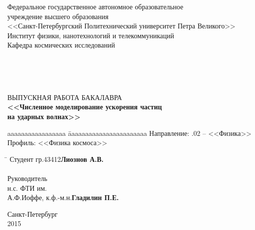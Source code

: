 \documentclass[a4paper,14pt]{extarticle} %
\begin{document}
\begin{titlepage}

\begin{center}
Федеральное государственное автономное образовательное\\
учреждение высшего образования\\
<<Санкт-Петербургский Политехнический университет Петра Великого>>\\
Институт физики, нанотехнологий и телекоммуникаций\\
Кафедра космических исследований \\
\end{center}  

\vspace{1em}

\begin{flushright}
\parindent=0pt
\\
\\
\\
\end{flushright}

\vspace{1em}

\begin{center}
ВЫПУСКНАЯ РАБОТА БАКАЛАВРА\\
\Large\textbf{<<Численное моделирование ускорения частиц\\ на ударных волнах>>}
\end{center}

\vspace{1em}

\begin{flushleft}
\begin{tabbing}
aaaaaaaaaaaaaaaaa \= aaaaaaaaaaaaaaaaaaaaaaa \kill
Направление: .02 -- <<Физика>>\\
Профиль: \> <<Физика космоса>>\\
\end{tabbing}
\end{flushleft}

\vspace{1em}

\begin{tabbing}
  \hspace{17cm}\=\kill
  Студент гр.43412\>\textbf{Лиознов А.В.}\'\\~\\
  Руководитель\> \'\\
  н.с. ФТИ им.\\
А.Ф.Иоффе, к.ф.-м.н.\>\textbf{Гладилин П.Е.}\'\\
\end{tabbing}

\vspace{\fill}

\begin{center}
Санкт-Петербург\\
2015
\end{center}

\end{titlepage}
\newpage
\tableofcontents
\newpage
\end{document}
